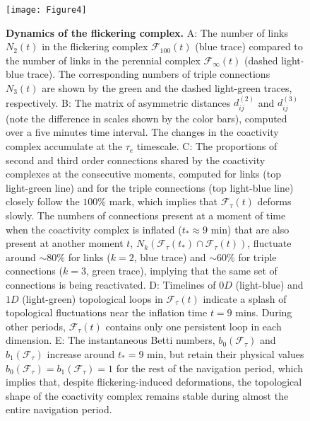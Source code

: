 \documentclass[12pt,tightenlines]{revtex4}
\begin{document}
\begin{figure}[!h]
\texttt{[image: Figure4]}
\caption{{\footnotesize\textbf{Dynamics of the flickering complex.} A: The number of links $N_2(t)$ in the flickering complex 
$\mathcal{F}_{100}(t)$ (blue trace) compared to the number of links in the perennial complex $\mathcal{F}_{\infty}(t)$ (dashed 
light-blue trace). 
The corresponding numbers of triple connections $N_3(t)$ are shown by the green and the dashed light-green traces, respectively. 
B: The matrix of asymmetric distances $d^{(2)}_{ij}$ and $d^{(3)}_{ij}$ (note the difference in scales shown by the color bars), 
computed over a five minutes time interval. The changes in the coactivity complex accumulate at the $\tau_{e}$ timescale. 
C: The proportions of second and third order connections shared by the coactivity complexes at the consecutive moments, computed 
for links (top light-green line) and for the triple connections (top light-blue line) closely follow the $100\%$ mark, which implies 
that $\mathcal{F}_{\tau}(t)$ deforms slowly. The numbers of connections present at a moment of time when the coactivity complex 
is inflated ($t_{*} \approx 9$ min) that are also present at another moment $t$, $N_k(\mathcal{F}_{\tau}(t_{*})\cap\mathcal{F}_{\tau}(t))$, 
fluctuate around $\sim 80\%$ for links ($k = 2$, blue trace) and $\sim 60\%$ for triple connections ($k = 3$, green trace), implying 
that the same set of connections is being reactivated. D: Timelines of $0D$ (light-blue) and $1D$ (light-green) topological loops in 
$\mathcal{F}_{\tau}(t)$ indicate a splash of topological fluctuations near the inflation time $t = 9$ mins. During other periods, 
$\mathcal{F}_{\tau}(t)$ contains only one persistent loop in each dimension. 
E: The instantaneous Betti numbers, $b_0(\mathcal{F}_{\tau})$ and $b_1(\mathcal{F}_{\tau})$ increase around $t_{*} = 9$ min, 
but retain their physical values $b_0(\mathcal{F}_{\tau}) = b_1(\mathcal{F}_{\tau}) = 1$ for the rest of the navigation period, which 
implies that, despite flickering-induced deformations, the topological shape of the coactivity complex remains stable during almost 
the entire navigation period.}}
\label{Figure4}
\end{figure}
\end{document}
